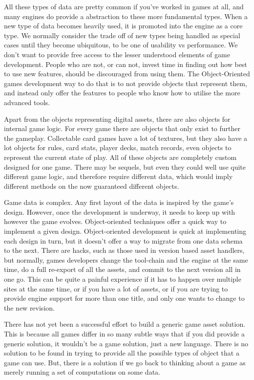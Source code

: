 All these types of data are pretty common if you've worked in games at all, and
many engines do provide a abstraction to these more fundamental types. When a
new type of data becomes heavily used, it is promoted into the engine as a core
type. We normally consider the trade off of new types being handled as special
cases until they become ubiquitous, to be one of usability vs performance. We
don't want to provide free access to the lesser understood elements of game
development. People who are not, or can not, invest time in finding out how
best to use new features, should be discouraged from using them. The
Object-Oriented games development way to do that is to not provide objects that
represent them, and instead only offer the features to people who know how to
utilise the more advanced tools.

Apart from the objects representing digital assets, there are also objects for
internal game logic. For every game there are objects that only exist to
further the gameplay. Collectable card games have a lot of textures, but they
also have a lot objects for rules, card stats, player decks, match records,
even objects to represent the current state of play. All of these objects are
completely custom designed for one game. There may be sequels, but even they
could well use quite different game logic, and therefore require different
data, which would imply different methods on the now guaranteed different
objects.

Game data is complex. Any first layout of the data is inspired by the game's
design. However, once the development is underway, it needs to keep up with
however the game evolves. Object-oriented techniques offer a quick way to
implement a given design. Object-oriented development is quick at implementing
each design in turn, but it doesn't offer a way to migrate from one data schema
to the next. There are hacks, such as those used in version based asset
handlers, but normally, games developers change the tool-chain and the engine
at the same time, do a full re-export of all the assets, and commit to the next
version all in one go. This can be quite a painful experience if it has to
happen over multiple sites at the same time, or if you have a lot of assets, or
if you are trying to provide engine support for more than one title, and only
one wants to change to the new revision.

There has not yet been a successful effort to build a generic game asset
solution. This is because all games differ in so many subtle ways that if you
did provide a generic solution, it wouldn't be a game solution, just a new
language. There is no solution to be found in trying to provide all the
possible types of object that a game can use. But, there is a solution if we go
back to thinking about a game as merely running a set of computations on some
data.

